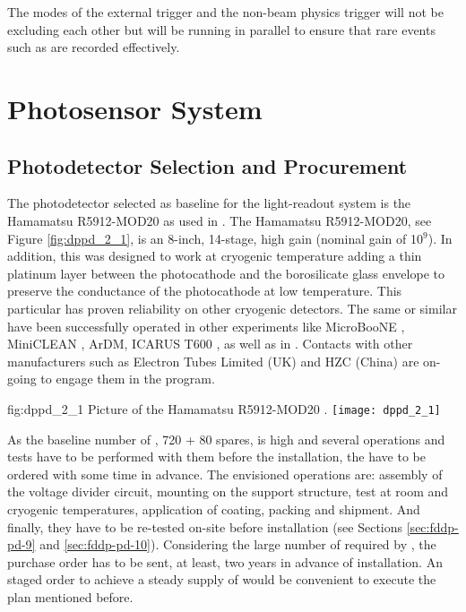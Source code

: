 The modes of the external trigger and the non-beam physics trigger will not be excluding each other but will be running in parallel to ensure that rare events such as   are recorded effectively.

\section{Photosensor System}
\label{sec:fddp-pd-2}

\subsection{Photodetector Selection and Procurement}
\label{sec:fddp-pd-2.1}

The photodetector selected as baseline for the light-readout system is the Hamamatsu R5912-MOD20  as used in . The Hamamatsu R5912-MOD20, see Figure \ref{fig:dppd_2_1}, is an 8-inch, 14-stage, high gain  (nominal gain of \num{10}$^9$). In addition, this  was designed to work at cryogenic temperature adding a thin platinum layer between the photocathode and the borosilicate glass envelope to preserve the conductance of the photocathode at low temperature. This particular  has proven reliability on other cryogenic detectors. The same or similar  have been successfully operated in other \lar experiments like MicroBooNE \cite{microboone}, MiniCLEAN \cite{miniclean}, ArDM, ICARUS T600 \cite{icarus}, as well as in  \cite{protoDUNDP-tdr}. Contacts with other manufacturers such as Electron Tubes Limited (UK) \cite{electrontubeslim} and HZC (China) \cite{hzc} are on-going to engage them in the program.

\begin{dunefigure}{fig:dppd_2_1}
{Picture of the Hamamatsu R5912-MOD20  \cite{hamamatsu-5912}.}
\texttt{[image: dppd\_2\_1]}
\end{dunefigure}

As the baseline number of , \num{720} + \num{80} spares, is high and several operations and tests have to be performed with them before the installation, the  have to be ordered with some time in advance. The envisioned operations are: assembly of the voltage divider circuit, mounting on the support structure, test at room and cryogenic temperatures, application of  coating, packing and shipment. And finally, they have to be re-tested on-site before installation (see Sections \ref{sec:fddp-pd-9} and \ref{sec:fddp-pd-10}). Considering the large number of  required by \dual {}, the purchase order has to be sent, at least, two years in advance of installation. An staged order to achieve a steady supply of  would be convenient to execute the plan mentioned before. 


